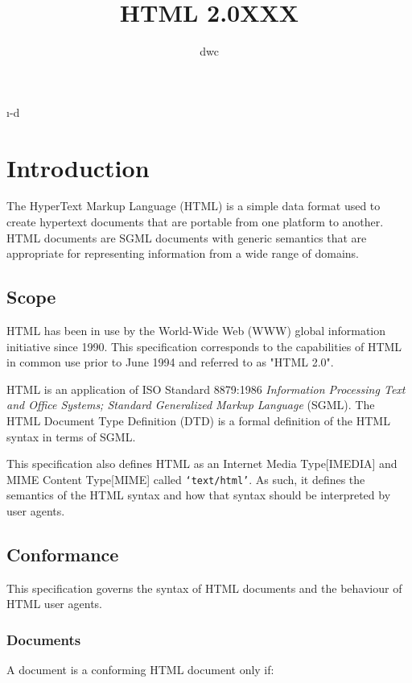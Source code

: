 \i-d
\title{HTML 2.0XXX}
\author{dwc}
\address{mit/w3c}


\section*{Introduction}\par 
The HyperText Markup Language (HTML) is a simple data format
used to create hypertext documents that are portable from one platform
to another.  HTML documents are SGML documents with generic semantics
that are appropriate for representing information from a wide range of
domains.
\par \subsection*{Scope}\par 
HTML has been in use by the World-Wide Web (WWW) global information
initiative since 1990.  This specification corresponds to the
capabilities of HTML in common use prior to June 1994 and referred to
as "HTML 2.0".
\par \par 
HTML is an application of ISO Standard 8879:1986 {\it Information
Processing Text and Office Systems;  Standard Generalized Markup
Language} (SGML).  The HTML Document Type Definition (DTD) is a
formal definition of the HTML syntax in terms of SGML.
\par \par 
This specification also defines HTML as an Internet Media Type[IMEDIA]
and MIME Content Type[MIME] called {\tt `text/html'}.  As such, it
defines the semantics of the HTML syntax and how that syntax should be
interpreted by user agents.
\par \subsection*{Conformance}\par 
This specification governs the syntax of HTML documents and the
behaviour of HTML user agents.
\par \subsubsection*{Documents}\par 
A document is a conforming HTML document only if:
